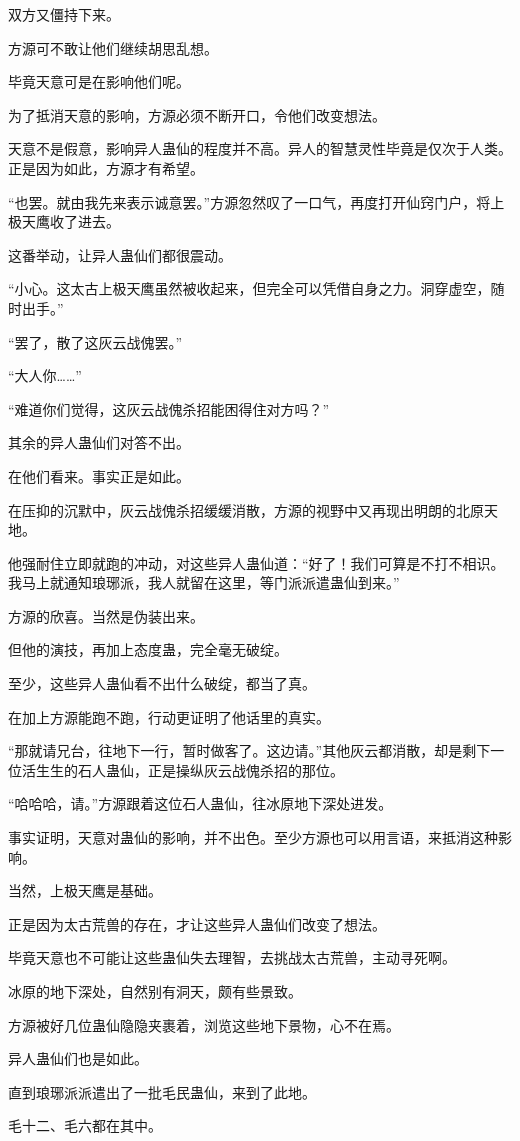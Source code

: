 \begin{this_body}
双方又僵持下来。

方源可不敢让他们继续胡思乱想。

毕竟天意可是在影响他们呢。

为了抵消天意的影响，方源必须不断开口，令他们改变想法。

天意不是假意，影响异人蛊仙的程度并不高。异人的智慧灵性毕竟是仅次于人类。正是因为如此，方源才有希望。

“也罢。就由我先来表示诚意罢。”方源忽然叹了一口气，再度打开仙窍门户，将上极天鹰收了进去。

这番举动，让异人蛊仙们都很震动。

“小心。这太古上极天鹰虽然被收起来，但完全可以凭借自身之力。洞穿虚空，随时出手。”

“罢了，散了这灰云战傀罢。”

“大人你……”

“难道你们觉得，这灰云战傀杀招能困得住对方吗？”

其余的异人蛊仙们对答不出。

在他们看来。事实正是如此。

在压抑的沉默中，灰云战傀杀招缓缓消散，方源的视野中又再现出明朗的北原天地。

他强耐住立即就跑的冲动，对这些异人蛊仙道：“好了！我们可算是不打不相识。我马上就通知琅琊派，我人就留在这里，等门派派遣蛊仙到来。”

方源的欣喜。当然是伪装出来。

但他的演技，再加上态度蛊，完全毫无破绽。

至少，这些异人蛊仙看不出什么破绽，都当了真。

在加上方源能跑不跑，行动更证明了他话里的真实。

“那就请兄台，往地下一行，暂时做客了。这边请。”其他灰云都消散，却是剩下一位活生生的石人蛊仙，正是操纵灰云战傀杀招的那位。

“哈哈哈，请。”方源跟着这位石人蛊仙，往冰原地下深处进发。

事实证明，天意对蛊仙的影响，并不出色。至少方源也可以用言语，来抵消这种影响。

当然，上极天鹰是基础。

正是因为太古荒兽的存在，才让这些异人蛊仙们改变了想法。

毕竟天意也不可能让这些蛊仙失去理智，去挑战太古荒兽，主动寻死啊。

冰原的地下深处，自然别有洞天，颇有些景致。

方源被好几位蛊仙隐隐夹裹着，浏览这些地下景物，心不在焉。

异人蛊仙们也是如此。

直到琅琊派派遣出了一批毛民蛊仙，来到了此地。

毛十二、毛六都在其中。

\end{this_body}

